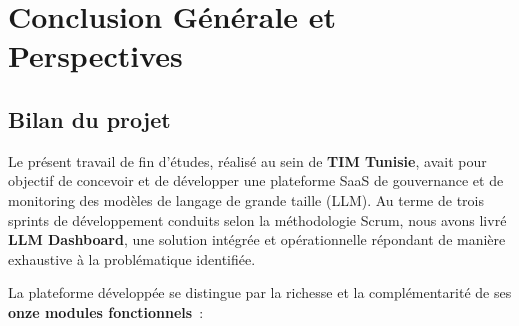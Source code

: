
\chapter*{Conclusion Générale et Perspectives}

\vspace{0.5cm}

\section*{Bilan du projet}

Le présent travail de fin d'études, réalisé au sein de \textbf{TIM Tunisie}, avait pour objectif de concevoir et de développer une plateforme SaaS de gouvernance et de monitoring des modèles de langage de grande taille (LLM). Au terme de trois sprints de développement conduits selon la méthodologie Scrum, nous avons livré \textbf{LLM Dashboard}, une solution intégrée et opérationnelle répondant de manière exhaustive à la problématique identifiée.

La plateforme développée se distingue par la richesse et la complémentarité de ses \textbf{onze modules fonctionnels}~:

